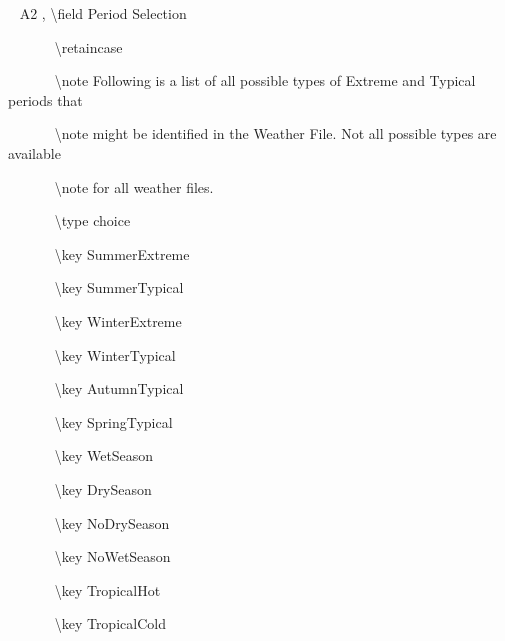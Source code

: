 ~ A2 , \textbackslash{}field Period Selection

~~~~~~ \textbackslash{}retaincase

~~~~~~ \textbackslash{}note Following is a list of all possible types of Extreme and Typical periods that

~~~~~~ \textbackslash{}note might be identified in the Weather File. Not all possible types are available

~~~~~~ \textbackslash{}note for all weather files.

~~~~~~ \textbackslash{}type choice

~~~~~~ \textbackslash{}key SummerExtreme

~~~~~~ \textbackslash{}key SummerTypical

~~~~~~ \textbackslash{}key WinterExtreme

~~~~~~ \textbackslash{}key WinterTypical

~~~~~~ \textbackslash{}key AutumnTypical

~~~~~~ \textbackslash{}key SpringTypical

~~~~~~ \textbackslash{}key WetSeason

~~~~~~ \textbackslash{}key DrySeason

~~~~~~ \textbackslash{}key NoDrySeason

~~~~~~ \textbackslash{}key NoWetSeason

~~~~~~ \textbackslash{}key TropicalHot

~~~~~~ \textbackslash{}key TropicalCold
